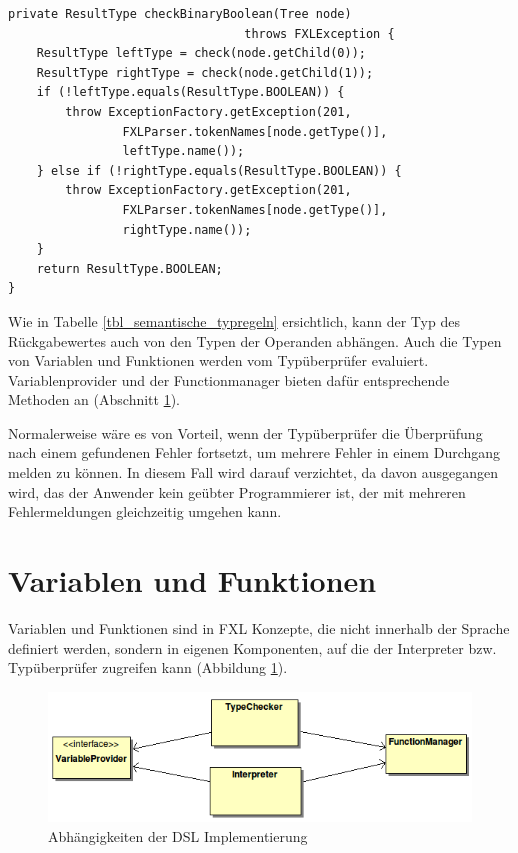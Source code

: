 \begin{lstlisting}[float = htbp,caption={Typ\-über\-prü\-fung der binären booleschen Operatoren},label=listing_check_binary_boolean]
private ResultType checkBinaryBoolean(Tree node)
                                 throws FXLException {
	ResultType leftType = check(node.getChild(0));
	ResultType rightType = check(node.getChild(1));
	if (!leftType.equals(ResultType.BOOLEAN)) {
		throw ExceptionFactory.getException(201,
				FXLParser.tokenNames[node.getType()],
				leftType.name());
	} else if (!rightType.equals(ResultType.BOOLEAN)) {
		throw ExceptionFactory.getException(201,
				FXLParser.tokenNames[node.getType()],
				rightType.name());
	}
	return ResultType.BOOLEAN;
}
\end{lstlisting}	

Wie in Tabelle \ref{tbl_semantische_typregeln} ersichtlich, kann der Typ des Rückgabewertes auch von den Typen der Operanden abhängen. Auch die Typen von Variablen und Funktionen werden vom Typüberprüfer evaluiert. Variablenprovider und der Functionmanager bieten dafür entsprechende Methoden an (Abschnitt \ref{section_implementierung_variablen_und_funktionen}).

Normalerweise wäre es von Vorteil, wenn der Typüberprüfer die Überprüfung nach einem gefundenen Fehler fortsetzt, um mehrere Fehler in einem Durchgang melden zu können. In diesem Fall wird darauf verzichtet, da davon ausgegangen wird, das der Anwender kein geübter Programmierer ist, der mit mehreren Fehlermeldungen gleichzeitig umgehen kann.

\section{Variablen und Funktionen}
\label{section_implementierung_variablen_und_funktionen}

Variablen und Funktionen sind in FXL Konzepte, die nicht innerhalb der Sprache definiert werden, sondern in eigenen Komponenten, auf die der Interpreter bzw. Typüberprüfer zugreifen kann (Abbildung \ref{figure_dsl_overview}). 

\begin{figure}[h]
\includegraphics[scale=0.7]{figures/uml_dsl_overview}
\caption{Abhängigkeiten der DSL Implementierung}
\label{figure_dsl_overview}
\end{figure}



